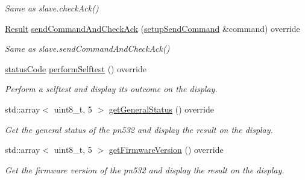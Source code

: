 \begin{DoxyCompactItemize}
\begin{DoxyCompactList}\small\item\em Same as slave.\+check\+Ack() \end{DoxyCompactList}\item 
\mbox{\label{classnfc_1_1NfcOled_afcd62a218b26b6d7a59eb27fdc7b1c78}} 
\hyperlink{structnfc_1_1Result}{Result} \hyperlink{classnfc_1_1NfcOled_afcd62a218b26b6d7a59eb27fdc7b1c78}{send\+Command\+And\+Check\+Ack} (\hyperlink{classsetupSendCommand}{setup\+Send\+Command} \&command) override
\begin{DoxyCompactList}\small\item\em Same as slave.\+send\+Command\+And\+Check\+Ack() \end{DoxyCompactList}\item 
\mbox{\label{classnfc_1_1NfcOled_a76e1f57a8cf76b22029df6da4d8bacd2}} 
\hyperlink{declarations_8h_ae1d20c5a38cae82ccaa6a77be3fd264b}{status\+Code} \hyperlink{classnfc_1_1NfcOled_a76e1f57a8cf76b22029df6da4d8bacd2}{perform\+Selftest} () override
\begin{DoxyCompactList}\small\item\em Perform a selftest and display it\textquotesingle{}s outcome on the display. \end{DoxyCompactList}\item 
\mbox{\label{classnfc_1_1NfcOled_a037638d75c50a76c7f62d0e69cb44cdb}} 
std\+::array$<$ uint8\+\_\+t, 5 $>$ \hyperlink{classnfc_1_1NfcOled_a037638d75c50a76c7f62d0e69cb44cdb}{get\+General\+Status} () override
\begin{DoxyCompactList}\small\item\em Get the general status of the pn532 and display the result on the display. \end{DoxyCompactList}\item 
\mbox{\label{classnfc_1_1NfcOled_add83fefdd3a5eadc6f85617173d08336}} 
std\+::array$<$ uint8\+\_\+t, 5 $>$ \hyperlink{classnfc_1_1NfcOled_add83fefdd3a5eadc6f85617173d08336}{get\+Firmware\+Version} () override
\begin{DoxyCompactList}\small\item\em Get the firmware version of the pn532 and display the result on the display. \end{DoxyCompactList}\item 

\end{DoxyCompactItemize}
